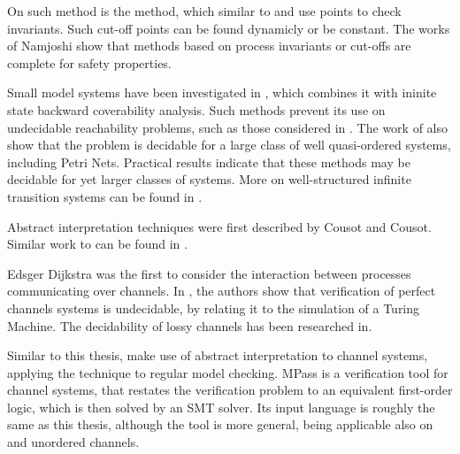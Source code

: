 On such method is the  method\cite{invinv}, which similar to \cite{parosh} and \cite{namjoshi} use  points to check invariants. Such cut-off points can be found dynamicly\cite{kaiser2010} or be constant\cite{emerson1995}. The works of Namjoshi\cite{namjoshi}  show that methods based on process invariants or cut-offs are complete for safety properties.

Small model systems have been investigated in \cite{kaiser2010}, which combines it with ininite state backward coverability analysis. Such methods prevent its use on undecidable reachability problems, such as those considered in \cite{parosh}. The work of \cite{parosh} also show that the problem is decidable for a large class of well quasi-ordered systems, including Petri Nets\cite{parosh}. Practical results indicate that these methods may be decidable for yet larger classes of systems. More on well-structured infinite transition systems can be found in \cite{finkel2001}.

Abstract interpretation techniques were first described by Cousot and Cousot\cite{cousot1977}\cite{cousot1979}. Similar work to \cite{parosh} can be found in \cite{raskin2006, ganty2006}.

Edsger Dijkstra was the first to consider the interaction between processes communicating over channels\cite{dijkstra1972}\cite{baier2008}. In \cite{bz83}, the authors show that verification of perfect channels systems is undecidable, by relating it to the simulation of a Turing Machine\cite{bz83}. The decidability of lossy channels has been researched in\cite{287591, gordon}.


Similar to this thesis, \cite{le2006} make use of abstract interpretation to channel systems, applying the technique to regular model checking. MPass\cite{mpass} is a verification tool for channel systems, that restates the verification problem to an equivalent first-order logic, which is then solved by an SMT solver. Its input language is roughly the same as this thesis, although the tool is more general, being applicable also on  and unordered channels.

